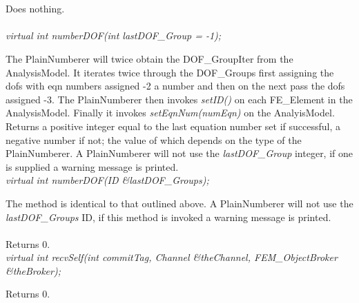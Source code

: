 \\
\\ 
Does nothing. \\

\\
{\em virtual int numberDOF(int lastDOF\_Group = -1);} 

The PlainNumberer will twice obtain the DOF\_GroupIter from the
AnalysisModel. It iterates twice through the DOF\_Groups first
assigning the dofs with eqn numbers assigned -2 a number and 
then on the next pass the dofs assigned -3. The PlainNumberer then
invokes {\em setID()} on each FE\_Element in the
AnalysisModel. Finally it invokes {\em setEqnNum(numEqn)} on the
AnalyisModel. Returns a positive integer equal to the last equation
number set if successful, a negative number if not; the value of 
which depends on the type of the PlainNumberer. A PlainNumberer will
not use the {\em lastDOF\_Group} integer, if one is supplied a warning
message is printed. \\ 

{\em virtual int numberDOF(ID \&lastDOF\_Groups);} 

The method is identical to that outlined above. A PlainNumberer will
not use the {\em lastDOF\_Groups} ID, if this method is invoked a warning
message is printed. \\ 


\\ 
Returns $0$. \\

{\em virtual int recvSelf(int commitTag, Channel \&theChannel, FEM\_ObjectBroker \&theBroker);}

Returns $0$.






